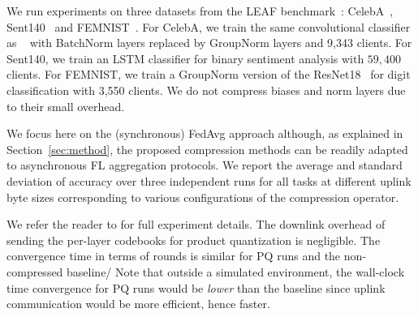 We run experiments on three datasets from the LEAF benchmark~\citep{caldas2018leaf}: CelebA~\citep{liu2015faceattributes}, Sent140~\citep{Go_Bhayani_Huang_2009} and FEMNIST~\citep{lecun2010mnist}. For CelebA, we train the same convolutional classifier as ~\citet{nguyen2021federated} with BatchNorm layers replaced by GroupNorm layers and 9,343 clients. For Sent140, we train an LSTM classifier for binary sentiment analysis with $59,400$ clients. 
For FEMNIST, we train a GroupNorm version of the ResNet18~\citep{he2015deep} for digit classification with 3,550 clients. 
We do not compress biases and norm layers due to their small overhead. 

  We focus here on the (synchronous) FedAvg approach although, as explained in Section~\ref{sec:method}, the proposed compression methods can be readily adapted to asynchronous FL aggregation protocols. 
We report the average and standard deviation of accuracy over three independent runs for all tasks at different uplink byte sizes corresponding to various configurations of the compression operator.


 We refer the reader to \cite{techreport} for full experiment details. 
The downlink overhead of sending the per-layer codebooks for product quantization is negligible. 
The convergence time in terms of rounds is similar for PQ runs and the non-compressed baseline/
Note that outside a simulated environment, the wall-clock time convergence for PQ runs would be \emph{lower} than the baseline since uplink communication would be more efficient, hence faster.

